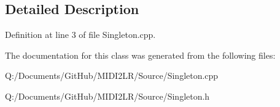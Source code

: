 \subsection{Detailed Description}


Definition at line 3 of file Singleton.\+cpp.



The documentation for this class was generated from the following files\+:\begin{DoxyCompactItemize}
\item 
Q\+:/\+Documents/\+Git\+Hub/\+M\+I\+D\+I2\+L\+R/\+Source/Singleton.\+cpp\item 
Q\+:/\+Documents/\+Git\+Hub/\+M\+I\+D\+I2\+L\+R/\+Source/Singleton.\+h\end{DoxyCompactItemize}
